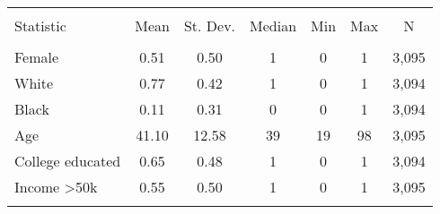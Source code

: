 
\begin{tabular}{@{\extracolsep{5pt}}lcccccc} 
\\[-1.8ex]\hline 
\hline \\[-1.8ex] 
Statistic & \multicolumn{1}{c}{Mean} & \multicolumn{1}{c}{St. Dev.} & \multicolumn{1}{c}{Median} & \multicolumn{1}{c}{Min} & \multicolumn{1}{c}{Max} & \multicolumn{1}{c}{N} \\ 
\hline \\[-1.8ex] 
Female & 0.51 & 0.50 & 1 & 0 & 1 & 3,095 \\ 
White & 0.77 & 0.42 & 1 & 0 & 1 & 3,094 \\ 
Black & 0.11 & 0.31 & 0 & 0 & 1 & 3,094 \\ 
Age & 41.10 & 12.58 & 39 & 19 & 98 & 3,095 \\ 
College educated & 0.65 & 0.48 & 1 & 0 & 1 & 3,094 \\ 
Income \textgreater 50k & 0.55 & 0.50 & 1 & 0 & 1 & 3,095 \\ 
\hline \\[-1.8ex] 
\end{tabular} 
